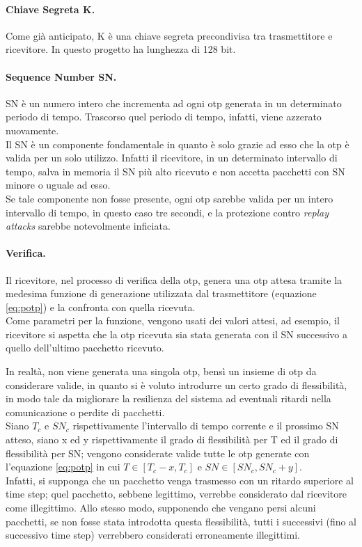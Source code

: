 \paragraph{Chiave Segreta K.}
Come già anticipato, K è una chiave segreta precondivisa tra trasmettitore e ricevitore. In questo progetto ha lunghezza di 128 bit.

\paragraph{Sequence Number SN.}
SN è un numero intero che incrementa ad ogni \gls{otp} generata in un determinato periodo di tempo. Trascorso quel periodo di tempo, infatti, viene azzerato nuovamente.\\
Il SN è un componente fondamentale in quanto è solo grazie ad esso che la \gls{otp} è valida per un solo utilizzo. Infatti il ricevitore, in un determinato intervallo di tempo, salva in memoria il SN più alto ricevuto e non accetta pacchetti con SN minore o uguale ad esso.\\
Se tale componente non fosse presente, ogni \gls{otp} sarebbe valida per un intero intervallo di tempo, in questo caso tre secondi, e la protezione contro \textit{replay attacks} sarebbe notevolmente inficiata.

\paragraph{Verifica.}
Il ricevitore, nel processo di verifica della \gls{otp}, genera una \gls{otp} attesa tramite la medesima funzione di generazione utilizzata dal trasmettitore (equazione \ref{eq:potp}) e la confronta con quella ricevuta.\\
Come parametri per la funzione, vengono usati dei valori attesi, ad esempio, il ricevitore si aspetta che la \gls{otp} ricevuta sia stata generata con il SN successivo a quello dell'ultimo pacchetto ricevuto.

In realtà, non viene generata una singola \gls{otp}, bensì un insieme di \gls{otp} da considerare valide, in quanto si è voluto introdurre un certo grado di flessibilità, in modo tale da migliorare la resilienza del sistema ad eventuali ritardi nella comunicazione o perdite di pacchetti.\\
Siano $T_c$ e $SN_c$ rispettivamente l'intervallo di tempo corrente e il prossimo SN atteso, siano x ed y rispettivamente il grado di flessibilità per T ed il grado di flessibilità per SN; vengono considerate valide tutte le \gls{otp} generate con l'equazione \ref{eq:potp} in cui $T \in [T_c - x, T_c]$ e $SN \in [SN_c, SN_c + y]$.\\
Infatti, si supponga che un pacchetto venga trasmesso con un ritardo superiore al time step; quel pacchetto, sebbene legittimo, verrebbe considerato dal ricevitore come illegittimo. Allo stesso modo, supponendo che vengano persi alcuni pacchetti, se non fosse stata introdotta questa flessibilità, tutti i successivi (fino al successivo time step) verrebbero considerati erroneamente illegittimi.


